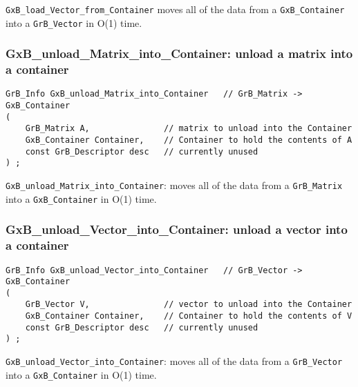 \verb'GxB_load_Vector_from_Container' moves all of the data from a
\verb'GxB_Container' into a \verb'GrB_Vector' in O(1) time.

\newpage
\subsubsection{{\sf GxB\_unload\_Matrix\_into\_Container:} unload a matrix into a container}
\label{unload_matrix_into_container}

\begin{mdframed}[userdefinedwidth=6in]
{\footnotesize
\begin{verbatim}
GrB_Info GxB_unload_Matrix_into_Container   // GrB_Matrix -> GxB_Container
(
    GrB_Matrix A,               // matrix to unload into the Container
    GxB_Container Container,    // Container to hold the contents of A
    const GrB_Descriptor desc   // currently unused
) ;
\end{verbatim}
} \end{mdframed}

\verb'GxB_unload_Matrix_into_Container': moves all of the data from
a \verb'GrB_Matrix' into a \verb'GxB_Container' in O(1) time.

\subsubsection{{\sf GxB\_unload\_Vector\_into\_Container:} unload a vector into a container}
\label{unload_vector_into_container}

\begin{mdframed}[userdefinedwidth=6in]
{\footnotesize
\begin{verbatim}
GrB_Info GxB_unload_Vector_into_Container   // GrB_Vector -> GxB_Container
(
    GrB_Vector V,               // vector to unload into the Container
    GxB_Container Container,    // Container to hold the contents of V
    const GrB_Descriptor desc   // currently unused
) ;
\end{verbatim}
} \end{mdframed}

\verb'GxB_unload_Vector_into_Container': moves all of the data from
a \verb'GrB_Vector' into a \verb'GxB_Container' in O(1) time.

